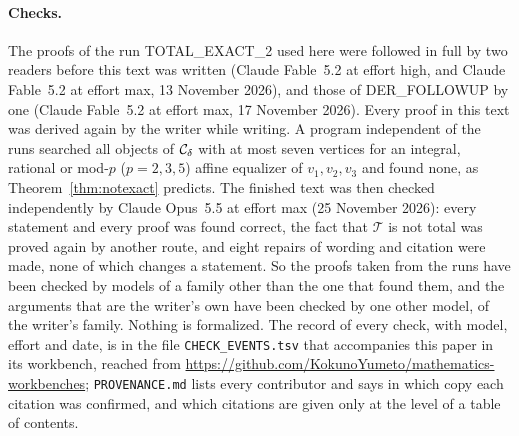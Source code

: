 \paragraph{Checks.} The proofs of the run TOTAL\_EXACT\_2 used here were
followed in full by two readers before this text was written (Claude
Fable~5.2 at effort high, and Claude Fable~5.2 at effort max, 13 November
2026), and those of DER\_FOLLOWUP by one (Claude Fable~5.2 at effort max, 17
November 2026). Every proof in this text was derived again by the writer
while writing. A program independent of the runs searched all objects of
$\mathcal{C}_{\delta}$ with at most seven vertices for an integral, rational or mod-$p$
($p=2,3,5$) affine equalizer of $v_1,v_2,v_3$ and found none, as
Theorem~\ref{thm:notexact} predicts. The finished text was then checked
independently by Claude Opus~5.5 at effort max (25 November 2026): every
statement and every proof was found correct, the fact that $\mathcal T$ is not
total was proved again by another route, and eight repairs of wording and
citation were made, none of which changes a statement. So the proofs taken
from the runs have been checked by models of a family other than the one
that found them, and the arguments that are the writer's own have been
checked by one other model, of the writer's family. Nothing is formalized.
The record of every check, with model, effort and date, is in the file
\texttt{CHECK\_EVENTS.tsv} that accompanies this paper in its workbench, reached
from \url{https://github.com/KokunoYumeto/mathematics-workbenches};
\texttt{PROVENANCE.md} lists every contributor and says in which copy each
citation was confirmed, and which citations are given only at the level of
a table of contents.
